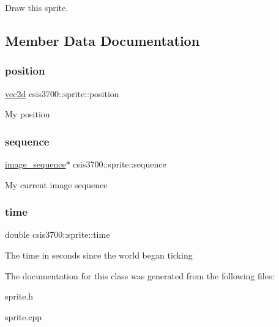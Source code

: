 Draw this sprite. 

\subsection{Member Data Documentation}
\mbox{\label{classcsis3700_1_1sprite_aab9ac03c13c18eca432f5db06a8383b8}} 
\subsubsection{\texorpdfstring{position}{position}}
{\footnotesize\ttfamily \hyperlink{classcsis3700_1_1vec2d}{vec2d} csis3700\+::sprite\+::position\hspace{0.3cm}{\ttfamily [protected]}}

My position \mbox{\label{classcsis3700_1_1sprite_aa65b73f9bf7d266e57236f5b606b36e1}} 
\subsubsection{\texorpdfstring{sequence}{sequence}}
{\footnotesize\ttfamily \hyperlink{classcsis3700_1_1image__sequence}{image\+\_\+sequence}$\ast$ csis3700\+::sprite\+::sequence\hspace{0.3cm}{\ttfamily [protected]}}

My current image sequence \mbox{\label{classcsis3700_1_1sprite_af12d2211006b3a184af6b70ed9e4235a}} 
\subsubsection{\texorpdfstring{time}{time}}
{\footnotesize\ttfamily double csis3700\+::sprite\+::time\hspace{0.3cm}{\ttfamily [protected]}}

The time in seconds since the world began ticking 

The documentation for this class was generated from the following files\+:\begin{DoxyCompactItemize}
\item 
sprite.\+h\item 
sprite.\+cpp\end{DoxyCompactItemize}

